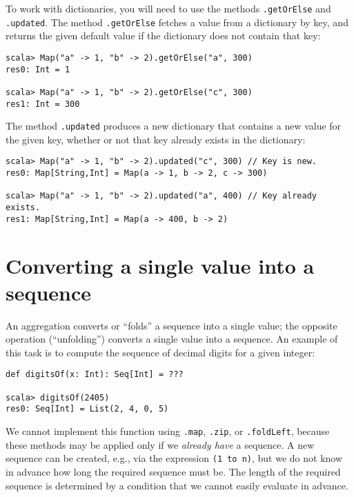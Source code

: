 To work with dictionaries, you will need to use the methods \lstinline!.getOrElse!
and \lstinline!.updated!.
The method \lstinline!.getOrElse!
fetches a value from a dictionary by key, and returns the given default
value if the dictionary does not contain that key:
\begin{lstlisting}
scala> Map("a" -> 1, "b" -> 2).getOrElse("a", 300)
res0: Int = 1

scala> Map("a" -> 1, "b" -> 2).getOrElse("c", 300)
res1: Int = 300
\end{lstlisting}
The method \lstinline!.updated!
produces a new dictionary that contains a new value for the given
key, whether or not that key already exists in the dictionary:
\begin{lstlisting}
scala> Map("a" -> 1, "b" -> 2).updated("c", 300) // Key is new.
res0: Map[String,Int] = Map(a -> 1, b -> 2, c -> 300)

scala> Map("a" -> 1, "b" -> 2).updated("a", 400) // Key already exists.
res1: Map[String,Int] = Map(a -> 400, b -> 2) 
\end{lstlisting}
\begin{comment}
Solution:\inputencoding{latin9}
\begin{lstlisting}
def groupBy[A, K](xs: Seq[A])(by: A => K): Map[K, Seq[A]] = {  
  val init: Map[K, Seq[A]] = Map()
  xs.foldLeft(init) { (res, x) =>
    val key = by(x)
    val seq = res.getOrElse(key, Seq()) ++ Seq(x)
    res.updated(key, seq)
  }
}
\end{lstlisting}
\inputencoding{utf8}\end{comment}


\section{Converting a single value into a sequence\label{sec:ch2Converting-a-single}}

An aggregation converts or ``folds'' a sequence into a single value;
the opposite operation (``unfolding'') converts a single value into
a sequence. An example of this task is to compute the sequence of
decimal digits for a given integer:
\begin{lstlisting}
def digitsOf(x: Int): Seq[Int] = ???

scala> digitsOf(2405)
res0: Seq[Int] = List(2, 4, 0, 5)
\end{lstlisting}
We cannot implement this function using \lstinline!.map!,
\lstinline!.zip!, or \lstinline!.foldLeft!,
because these methods may be applied only if we \emph{already have}
a sequence. A new sequence can be created, e.g., via the expression
\lstinline!(1 to n)!, but
we do not know in advance how long the required sequence must be.
The length of the required sequence is determined by a condition that
we cannot easily evaluate in advance.

